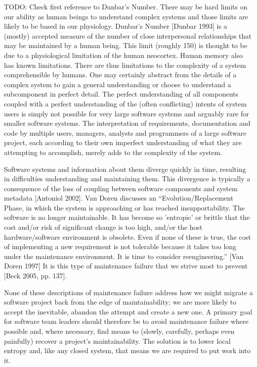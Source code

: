 TODO: Check first reference to Dunbar's Number.
There may be hard limits on our ability as human beings to understand complex systems and those limits are likely to be based in our physiology.  Dunbar's Number [Dunbar 1993] is a (mostly) accepted measure of the number of close interpersonal relationships that may be maintained by a human being.  This limit (roughly 150) is thought to be due to a physiological limitation of the human neocortex.  Human memory also has known limitations.  There are thus limitations to the complexity of a system comprehensible by humans.  One may certainly abstract from the details of a complex system to gain a general understanding or choose to understand a subcomponent in perfect detail.  The perfect understanding of all components coupled with a perfect understanding of the (often conflicting) intents of system users is simply not possible for very large software systems and arguably rare for smaller software systems.  The interpretation of requirements, documentation and code by multiple users, managers, analysts and programmers of a large software project, each according to their own imperfect understanding of what they are attempting to accomplish, merely adds to the complexity of the system.

Software systems and information about them diverge quickly in time, resulting in difficulties understanding and maintaining them.  This divergence is typically a consequence of the loss of coupling between software components and system metadata [Antoniol 2002].   Van Doren discusses an ``Evolution/Replacement Phase, in which the system is approaching or has reached insupportability. The software is no longer maintainable. It has become so 'entropic' or brittle that the cost and/or risk of significant change is too high, and/or the host hardware/software environment is obsolete. Even if none of these is true, the cost of implementing a new requirement is not tolerable because it takes too long under the maintenance environment. It is time to consider reengineering.'' [Van Doren 1997]  It is this type of maintenance failure that we strive most to prevent [Beck 2005, pp. 137].

None of these descriptions of maintenance failure address how we might migrate a software project back from the edge of maintainability; we are more likely to accept the inevitable, abandon the attempt and create a new one.  A primary goal for software team leaders should therefore be to avoid maintenance failure where possible and, where necessary, find means to (slowly, carefully, perhaps even painfully) recover a project's maintainability.  The solution is to lower local entropy and, like any closed system, that means we are required to put work into it.


